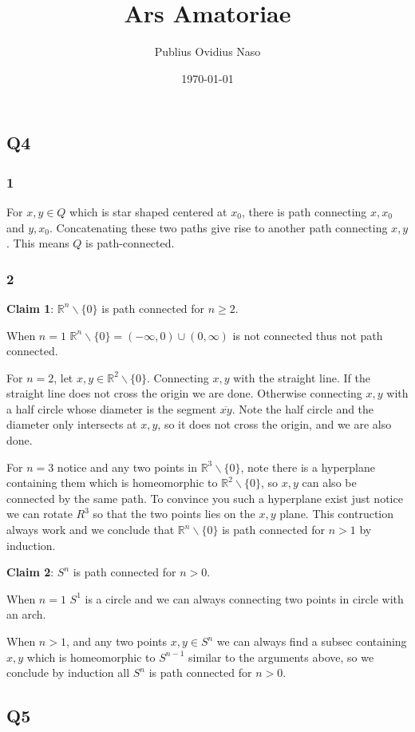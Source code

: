 \documentclass{article}
\title{Ars Amatoriae}
\author{Publius Ovidius Naso}
\date{\today}
\theoremstyle{definition}
\theoremstyle{definition}
\theoremstyle{remark}
\newcommand{\bb}[1]{\mathbb{#1}} %
\begin{document}

\subsection*{Q4}
\subsubsection*{1}
For $x, y \in Q$ which is star shaped centered at $x_0$, there is path connecting $x, x_0$ and $y, x_0$. Concatenating these two paths give rise to another path connecting $x, y$. 
This means $Q$ is path-connected.

\subsubsection*{2}

\textbf{Claim 1}: $\bb{R}^n \backslash \{0\}$ is path connected for $n \geq 2$.

When $n = 1$ $\bb{R}^n \backslash \{0\} = (-\infty, 0) \cup (0, \infty)$ is not connected thus not path connected.

For $n = 2$, let $x, y \in \bb{R}^2 \backslash \{0\}$. 
Connecting $x, y$ with the straight line. 
If the straight line does not cross the origin we are done. 
Otherwise connecting $x ,y$ with a half circle whose diameter is the segment $\overline{xy}$. 
Note the half circle and the diameter only intersects at $x,y$, so it does not cross the origin, and we are also done. 

For $n = 3$ notice and any two points in $\bb{R}^3 \backslash \{0\}$, note there is a hyperplane containing them which is homeomorphic to $\bb{R}^2 \backslash \{0\}$, so $x ,y$ can also be connected by the same path. 
To convince you such a hyperplane exist just notice we can rotate $R^3$ so that the two points lies on the $x,y$ plane.
This contruction always work and we conclude that $\bb{R}^n \backslash \{0\}$ is path connected for $n > 1$ by induction.

\textbf{Claim 2}: $S^n$ is path connected for $n > 0$.

When $n=1$ $S^1$ is a circle and we can always connecting two points in circle with an arch. 

When $n > 1$, and any two points $x,y \in S^n$ we can always find a subsec containing $x,y$ which is homeomorphic to $S^{n-1}$ similar to the arguments above, so we conclude by induction all $S^{n}$ is path connected for $n > 0$.

\subsection*{Q5}
\end{document}
